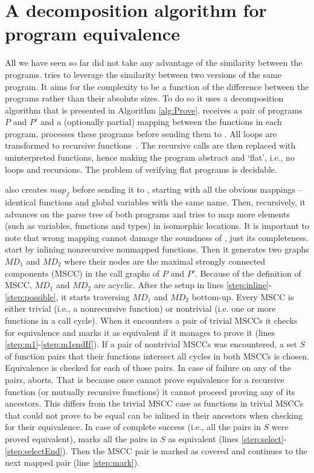 \section{A decomposition algorithm for program equivalence}
\label{sec:rvtreview}
All we have seen so far did not take any advantage of the similarity between the programs.  tries to leverage the similarity between two versions of the same program. It aims for the complexity to be a function of the difference between the programs rather than their absolute sizes. To do so it uses a decomposition algorithm that is presented in Algorithm \ref{alg:Prove}.  receives a pair of programs $P$ and $P'$ and a (optionally partial) mapping between the functions in each program.  processes these programs before sending them to . All loops are transformed to recursive functions~\cite{DBLP:conf/vstte/StrichmanG05}. The recursive calls are then replaced with uninterpreted functions, hence making the program abstract and `flat', i.e., no loops and recursions. The problem of verifying flat programs is decidable. 

 also creates $map_f$ before sending it to , starting with all the obvious mappings – identical functions and global variables with the same name. Then, recursively, it advances on the parse tree of both programs and tries to map more elements (such as variables, functions and types) in isomorphic locations. It is important to note that wrong mapping cannot damage the soundness of , just its completeness. 
 start by inlining nonrecursive nonmapped functions. Then it generates two graphs $MD_1$ and $MD_2$ where their nodes are the maximal strongly connected components (MSCC) in the call graphs of $P$ and $P'$. Because of the definition of MSCC, $MD_1$ and $MD_2$ are acyclic. After the setup in lines \ref{step:inline}-\ref{step:possible}, it starts traversing $MD_1$ and $MD_2$ bottom-up. Every MSCC is either trivial (i.e., a nonrecursive function) or nontrivial (i.e. one or more functions in a call cycle). When it encounters a pair of trivial MSCCs it checks for equivalence and marks it as equivalent if it manages to prove it (lines \ref{step:m1}-\ref{step:m1endIf}). If a pair of nontrivial MSCCs was encountered, a set $S$ of function pairs that their functions intersect all cycles in both MSCCs is chosen. Equivalence is checked for each of those pairs. In case of failure on any of the pairs,  aborts. That is because once  cannot prove equivalence for a recursive function (or mutually recursive functions) it cannot proceed proving any of its ancestors. This differs from the trivial MSCC case as functions in trivial MSCCs that  could not prove to be equal can be inlined in their ancestors when checking for their equivalence. In case of complete success (i.e., all the pairs in $S$ were proved equivalent),  marks all the pairs in $S$ as equivalent (lines \ref{step:select}-\ref{step:selectEnd}). Then the MSCC pair is marked as covered and  continues to the next mapped pair (line \ref{step:mark}).

